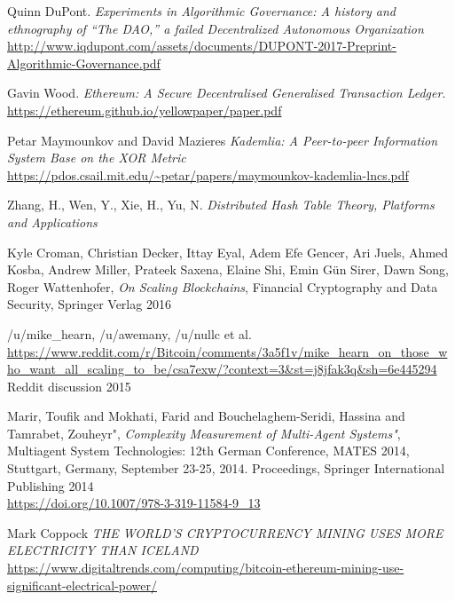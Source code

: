 \documentclass[twocolumn,showpacs,
  nofootinbib,aps,superscriptaddress,
  eqsecnum,prd,notitlepage,showkeys,10pt]{revtex4-1}
\begin{document}
\begin{thebibliography}{9}

Quinn DuPont.
\textit{Experiments in Algorithmic Governance: A history and ethnography of “The DAO,” a failed Decentralized Autonomous Organization}
\\\url{http://www.iqdupont.com/assets/documents/DUPONT-2017-Preprint-Algorithmic-Governance.pdf}

Gavin Wood.
\textit{Ethereum: A Secure Decentralised Generalised Transaction Ledger}.
\\\url{https://ethereum.github.io/yellowpaper/paper.pdf}

Petar Maymounkov and David Mazieres
\textit{Kademlia: A Peer-to-peer Information System Base on the XOR Metric}
\\\url{https://pdos.csail.mit.edu/~petar/papers/maymounkov-kademlia-lncs.pdf}

Zhang, H., Wen, Y., Xie, H., Yu, N.
\textit{
Distributed Hash Table
Theory, Platforms and Applications}

Kyle Croman, Christian Decker, Ittay Eyal, Adem Efe Gencer, Ari Juels, Ahmed Kosba, Andrew Miller, Prateek Saxena, Elaine Shi, Emin Gün Sirer, Dawn Song, Roger Wattenhofer,
\textit{On Scaling Blockchains},
Financial Cryptography and Data Security,
Springer Verlag 2016

/u/mike\_hearn, /u/awemany, /u/nullc et al.
\\\url{https://www.reddit.com/r/Bitcoin/comments/3a5f1v/mike_hearn_on_those_who_want_all_scaling_to_be/csa7exw/?context=3&st=j8jfak3q&sh=6e445294}
Reddit discussion
2015

Marir, Toufik and Mokhati, Farid and Bouchelaghem-Seridi, Hassina and Tamrabet, Zouheyr",
\textit{Complexity Measurement of Multi-Agent Systems"},
Multiagent System Technologies: 12th German Conference, MATES 2014, Stuttgart, Germany, September 23-25, 2014. Proceedings,
Springer International Publishing
2014
\\\url{https://doi.org/10.1007/978-3-319-11584-9_13}

Mark Coppock
\textit{THE WORLD’S CRYPTOCURRENCY MINING USES MORE ELECTRICITY THAN ICELAND}
\\\url{https://www.digitaltrends.com/computing/bitcoin-ethereum-mining-use-significant-electrical-power/}


\end{thebibliography}
\end{document}
